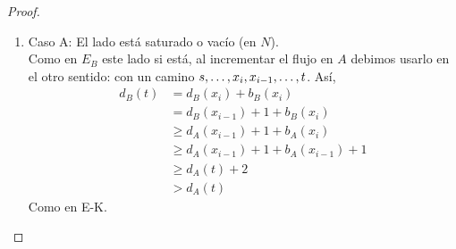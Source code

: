 \begin{proof}
\begin{enumerate}
    \begin{enumerate}
    \item Caso A: El lado está saturado o vacío (en $N$).\\
    Como en $E_B$ este lado si está, al incrementar el flujo en $A$ debimos usarlo en el otro sentido: con un camino $s, \mathellipsis, x_i, x_{i-1}, \mathellipsis, t$. Así,
    \begin{align}
        d_B(t)
        &= d_B(x_i) + b_B(x_i)\\
        &= d_B(x_{i-1}) + 1 + b_B(x_i)\\
        &\ge d_A(x_{i-1}) + 1 + b_A(x_i)\\
        &\ge d_A(x_{i-1}) + 1 + b_A(x_{i-1}) + 1\\
        &\ge d_A(t) + 2\\
        &> d_A(t)
    \end{align}
    Como en E-K.
         

\end{enumerate}
\end{enumerate}
\end{proof}
